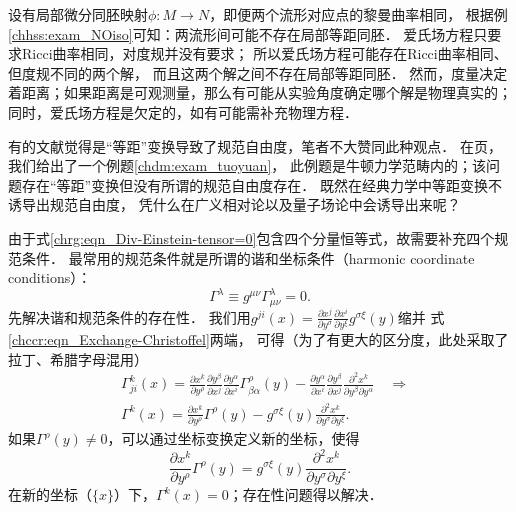 设有局部微分同胚映射$\phi:M\to N$，即便两个流形对应点的黎曼曲率相同，
根据例\ref{chhss:exam_NOiso}可知：两流形间可能不存在局部等距同胚．
爱氏场方程只要求Ricci曲率相同，对度规并没有要求；
所以爱氏场方程可能存在Ricci曲率相同、但度规不同的两个解，
而且这两个解之间不存在局部等距同胚．
然而，度量决定着距离；如果距离是可观测量，那么有可能从实验角度确定哪个解是物理真实的；
同时，爱氏场方程是欠定的，如有可能需补充物理方程．


有的文献觉得是“等距”变换导致了规范自由度，笔者不大赞同此种观点．
在\pageref{chdm:exam_tuoyuan}页，我们给出了一个例题\ref{chdm:exam_tuoyuan}，
此例题是牛顿力学范畴内的；该问题存在“等距”变换但没有所谓的规范自由度存在．
既然在经典力学中等距变换不诱导出规范自由度，
凭什么在广义相对论以及量子场论中会诱导出来呢？



由于式\eqref{chrg:eqn_Div-Einstein-tensor=0}包含四个分量恒等式，故需要补充四个规范条件．
最常用的规范条件就是所谓的谐和坐标条件（harmonic coordinate conditions）：
\begin{equation}\label{chfd:eqn_harmonic-coordinate}
    \Gamma^\lambda \equiv g^{\mu\nu} \Gamma^\lambda_{\mu\nu} =0.
\end{equation}
先解决谐和规范条件的存在性．
我们用$g^{ji}(x)=\frac{\partial x^j}{\partial y^\sigma}
\frac{\partial x^i}{\partial y^\xi}g^{\sigma\xi}(y)$缩并
式\eqref{chccr:eqn_Exchange-Christoffel}两端，
可得（为了有更大的区分度，此处采取了拉丁、希腊字母混用）
\begin{equation}
    \begin{aligned}
        & \Gamma^{k}_{ji}(x) = \frac{\partial x^k}{\partial  y^\rho}
        \frac{\partial y^\beta}{\partial x^j} \frac{\partial y^\alpha}{\partial x^i}
        \Gamma^{\rho}_{\beta\alpha}(y)
        -\frac{\partial y^\alpha }{\partial {x^i}}\frac{\partial {y^\beta }}{\partial {x^j}}
        \frac{{{\partial ^2}{x^k}}}
        {\partial {y^\beta }\partial {y^\alpha }}  \quad \Rightarrow \\
        &  \Gamma^{k}(x) = \frac{\partial x^k}{\partial  y^\rho} \Gamma^{\rho}(y)
        - g^{\sigma\xi}(y)    \frac{{{\partial ^2}{x^k}}}
        {\partial {y^\sigma }\partial {y^\xi }} .
    \end{aligned}
\end{equation}
如果$\Gamma^{\rho}(y) \neq 0$，可以通过坐标变换定义新的坐标，使得
\begin{equation}
    \frac{\partial x^k}{\partial  y^\rho} \Gamma^{\rho}(y)
    = g^{\sigma\xi}(y)    \frac{{{\partial ^2}{x^k}}}
    {\partial {y^\sigma }\partial {y^\xi }} .
\end{equation}
在新的坐标（$\{x\}$）下，$\Gamma^{k}(x)=0$；存在性问题得以解决．

